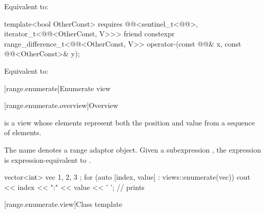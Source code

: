 \begin{itemdescr}
\pnum
\effects
Equivalent to: 
\end{itemdescr}

%
\begin{itemdecl}
template<bool OtherConst>
  requires @@<sentinel_t<@@>, iterator_t<@@<OtherConst, V>>>
friend constexpr range_difference_t<@@<OtherConst, V>>
  operator-(const @@& x, const @@<OtherConst>& y);
\end{itemdecl}

\begin{itemdescr}
\pnum
\effects
Equivalent to: 
\end{itemdescr}

[range.enumerate]{Enumerate view}

[range.enumerate.overview]{Overview}

\pnum
{}%
 is a view whose
elements represent both the position and value from
a sequence of elements.

\pnum
{}%
The name  denotes a range adaptor object.
Given a subexpression ,
the expression  is expression-equivalent to
.
\begin{example}
\begin{codeblock}
vector<int> vec{ 1, 2, 3 };
for (auto [index, value] : views::enumerate(vec))
  cout << index << ":" << value << ' ';         // prints 
\end{codeblock}
\end{example}

[range.enumerate.view]{Class template }

